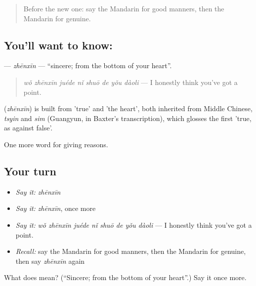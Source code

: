 \label{lesson:ZH-C358-zhenxin}



\begin{quote}
Before the new one: say the Mandarin for good manners, then the Mandarin for genuine.
\end{quote}

\subsection*{You'll want to know: }
\textbf{} — \emph{zhēnxīn} — \textquotedblleft{}sincere; from the bottom of your heart\textquotedblright{}.

\begin{quote}
\textbf{} \emph{wǒ zhēnxīn juéde nǐ shuō de yǒu dàoli} — I honestly think you've got a point.
\end{quote}

\begin{cousinweb}
\textbf{} (\emph{zhēnxīn}) is built from  'true' and  'the heart', both inherited from Middle Chinese, \emph{tsyin} and \emph{sim} (Guangyun, in Baxter's transcription), which glosses the first 'true, as against false'.
\end{cousinweb}

\begin{grammarlens}[title={What you've built}]
One more word for giving reasons.
\end{grammarlens}

\subsection*{Your turn}
\begin{itemize}
\raggedright
  \item \emph{Say it:} \emph{zhēnxīn}
  \item \emph{Say it:} \emph{zhēnxīn}, once more
  \item \emph{Say it:} \emph{wǒ zhēnxīn juéde nǐ shuō de yǒu dàoli} — I honestly think you've got a point.
  \item \emph{Recall:} say the Mandarin for good manners, then the Mandarin for genuine, then say \emph{zhēnxīn} again
\end{itemize}

\begin{tcolorbox}[breakable,colback=teal!4,colframe=teal!35!black,title={Before you move on}]
What does  mean? (\textquotedblleft{}Sincere; from the bottom of your heart\textquotedblright{}.) Say it once more.
\end{tcolorbox}
